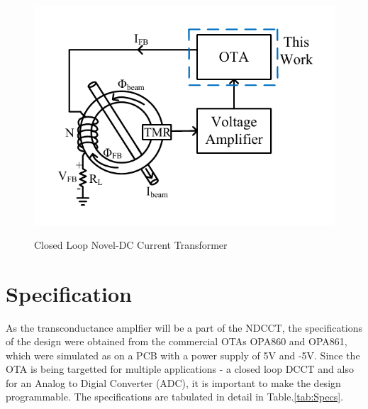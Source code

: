 \begin{figure} [H]
\centering
\includegraphics[scale=1]{Figures/System_Level/HRDCCT.pdf}
\caption{Closed Loop Novel-DC Current Transformer}
\label{fig:HRDCCT}
\cite{hrdcct}
\end{figure}

\vfill
\clearpage

\section{Specification}
As the transconductance amplfier will be a part of the NDCCT, the specifications of the design were obtained from the commercial OTAs OPA860 and OPA861, which were simulated as on a PCB with a power supply of 5V and -5V. Since the OTA is being targetted for multiple applications - a closed loop DCCT and also for an Analog to Digial Converter (ADC), it is important to make the design programmable. The specifications are tabulated in detail in Table.\ref{tab:Specs}.

